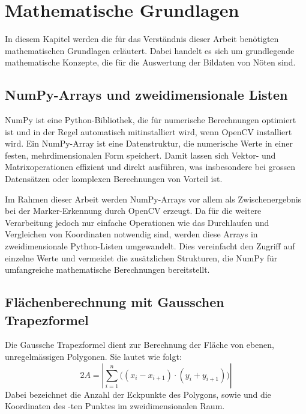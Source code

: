 \section{Mathematische Grundlagen}

In diesem Kapitel werden die für das Verständnis dieser Arbeit benötigten mathematischen Grundlagen erläutert.
Dabei handelt es sich um grundlegende mathematische Konzepte, die für die Auswertung der Bildaten von Nöten sind.

\subsection{NumPy-Arrays und zweidimensionale Listen}
\label{sub:numpy}
NumPy ist eine Python-Bibliothek, die für numerische Berechnungen optimiert ist und in der Regel automatisch mitinstalliert wird, wenn OpenCV installiert wird.
Ein NumPy-Array ist eine Datenstruktur, die numerische Werte in einer festen, mehrdimensionalen Form speichert.
Damit lassen sich Vektor- und Matrixoperationen effizient und direkt ausführen, was insbesondere bei grossen Datensätzen oder komplexen Berechnungen von Vorteil ist.

Im Rahmen dieser Arbeit werden NumPy-Arrays vor allem als Zwischenergebnis bei der Marker-Erkennung durch OpenCV erzeugt.
Da für die weitere Verarbeitung jedoch nur einfache Operationen wie das Durchlaufen und Vergleichen von Koordinaten notwendig sind, werden diese Arrays in zweidimensionale Python-Listen umgewandelt.
Dies vereinfacht den Zugriff auf einzelne Werte und vermeidet die zusätzlichen Strukturen, die NumPy für umfangreiche mathematische Berechnungen bereitstellt.

\subsection{Flächenberechnung mit Gausschen Trapezformel}
\label{sub:gauTrap}

Die Gaussche Trapezformel dient zur Berechnung der Fläche  von ebenen, unregelmässigen Polygonen. Sie lautet wie folgt:
\[
2A = \left| \sum_{i=1}^{n} \big((x_i - x_{i+1}) \cdot (y_i + y_{i+1}) \big) \right|
\]
Dabei bezeichnet  die Anzahl der Eckpunkte des Polygons, sowie  und  die Koordinaten des -ten Punktes im zweidimensionalen Raum.

